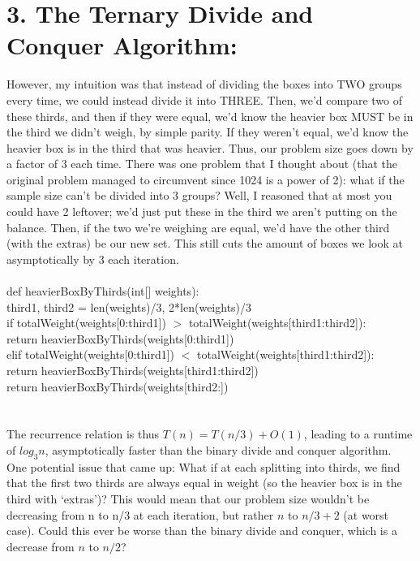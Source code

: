 \documentclass[11pt]{article}
\begin{document}
\section*{3. The Ternary Divide and Conquer Algorithm:}
\indent However, my intuition was that instead of dividing the boxes into TWO groups every time, we could instead divide it into THREE. Then, we’d compare two of these thirds, and then if they were equal, we’d know the heavier box MUST be in the third we didn’t weigh, by simple parity. If they weren’t equal, we’d know the heavier box is in the third that was heavier. Thus, our problem size goes down by a factor of 3 each time. There was one problem that I thought about (that the original problem managed to circumvent since 1024 is a power of 2): what if the sample size can’t be divided into 3 groups? Well, I reasoned that at most you could have 2 leftover; we’d just put these in the third we aren’t putting on the balance. Then, if the two we’re weighing are equal, we’d have the other third (with the extras) be our new set. This still cuts the amount of boxes we look at asymptotically by 3 each iteration. \\\\
def heavierBoxByThirds(int[] weights):\\
\indent	third1, third2 = len(weights)/3, 2*len(weights)/3\\
\indent	if totalWeight(weights[0:third1]) $>$ totalWeight(weights[third1:third2]):\\
\indent\indent return heavierBoxByThirds(weights[0:third1])\\
\indent	elif totalWeight(weights[0:third1]) $<$ totalWeight(weights[third1:third2]):\\
\indent\indent return heavierBoxByThirds(weights[third1:third2])\\
\indent	return heavierBoxByThirds(weights[third2:])\\
\\
\\
\indent The recurrence relation is thus $T(n) = T(n/3) + O(1)$, leading to a runtime of $log_3{n}$, asymptotically faster than the binary divide and conquer algorithm. \\
\indent One potential issue that came up: What if at each splitting into thirds, we find that the first two thirds are always equal in weight (so the heavier box is in the third with ‘extras’)? This would mean that our problem size wouldn’t be decreasing from n to n/3 at each iteration, but rather $n$ to $n/3 + 2$ (at worst case). Could this ever be worse than the binary divide and conquer, which is a decrease from $n$ to $n/2$?
\end{document}
